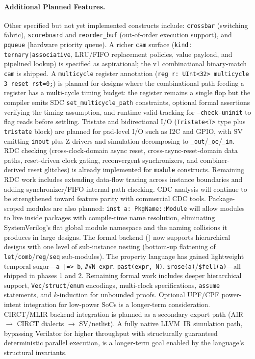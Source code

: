 \documentclass[manuscript]{acmart}
\begin{document}
\paragraph{Additional Planned Features.}
Other specified but not yet implemented constructs include:
\texttt{crossbar} (switching fabric),
\texttt{scoreboard} and \texttt{reorder\_buf} (out-of-order execution support),
and \texttt{pqueue} (hardware priority queue).
A richer \texttt{cam} surface (\texttt{kind: ternary|associative}, LRU/FIFO replacement policies, value payload, and pipelined lookup) is specified as aspirational; the v1 combinational binary-match \texttt{cam} is shipped.
A \texttt{multicycle} register annotation (\texttt{reg r: UInt<32> multicycle 3 reset rst=0;}) is planned for designs where the combinational path feeding a register has a multi-cycle timing budget: the register remains a single flop but the compiler emits SDC \texttt{set\_multicycle\_path} constraints, optional formal assertions verifying the timing assumption, and runtime valid-tracking for \texttt{--check-uninit} to flag reads before settling.
Tristate and bidirectional I/O (\texttt{Tristate<T>} type plus \texttt{tristate} block) are planned for pad-level I/O such as I2C and GPIO, with SV emitting \texttt{inout} plus Z-drivers and simulation decomposing to \texttt{\_out}/\texttt{\_oe}/\texttt{\_in}.
RDC checking (cross-clock-domain async reset, cross-async-reset-domain data paths, reset-driven clock gating, reconvergent synchronizers, and combiner-derived reset glitches) is already implemented for \texttt{module} constructs. Remaining RDC work includes extending data-flow tracing across instance boundaries and adding synchronizer/FIFO-internal path checking. CDC analysis will continue to be strengthened toward feature parity with commercial CDC tools.
Package-scoped modules are also planned: \texttt{inst a: PkgName::Module} will allow modules to live inside packages with compile-time name resolution, eliminating SystemVerilog's flat global module namespace and the naming collisions it produces in large designs.
The formal backend () now supports hierarchical designs with one level of sub-instance nesting (bottom-up flattening of \texttt{let}/\texttt{comb}/\texttt{reg}/\texttt{seq} sub-modules). The property language has gained lightweight temporal sugar---\texttt{a |=> b}, \texttt{\#\#N expr}, \texttt{past(expr, N)}, \texttt{\$rose(a)}/\texttt{\$fell(a)}---all shipped in phases 1 and 2. Remaining formal work includes deeper hierarchical support, \texttt{Vec}/\texttt{struct}/\texttt{enum} encodings, multi-clock specifications, \texttt{assume} statements, and $k$-induction for unbounded proofs.
Optional UPF/CPF power-intent integration for low-power SoCs is a longer-term consideration.
CIRCT/MLIR backend integration is planned as a secondary export path (AIR $\to$ CIRCT dialects $\to$ SV/netlist).
A fully native LLVM~IR simulation path, bypassing Verilator for higher throughput with structurally guaranteed deterministic parallel execution, is a longer-term goal enabled by the language's structural invariants.
\end{document}
